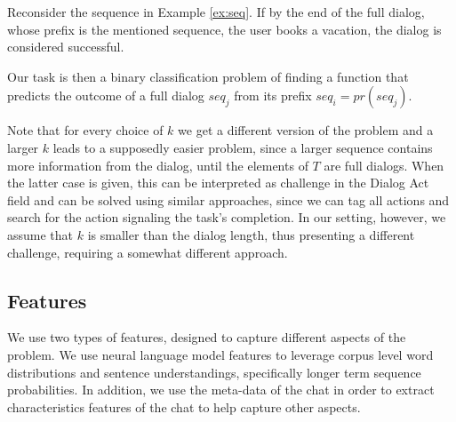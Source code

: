 \begin{example}
Reconsider the sequence in Example \ref{ex:seq}.  
If by the end of the full dialog, whose prefix is the mentioned sequence, 
the user books a vacation, the dialog is considered successful.
\end{example}


Our task is then a binary classification 
problem of finding a function that predicts the outcome 
of a full dialog $seq_j$ from its prefix $seq_i = pr(seq_j)$. 

Note that for every choice of $k$ we get a different 
version of the problem and a larger $k$ leads 
to a supposedly easier problem, since a larger sequence contains 
more information from the dialog, until the elements of $T$ 
are full dialogs. When the latter case is 
given, this can be interpreted as challenge in the Dialog Act field \cite{cs-CL-0006023,DBLP:conf/icassp/JiB05,DBLP:conf/coling/WermterL96} and can be solved using similar approaches, since we 
can tag all actions and search for the action signaling the task's completion. 
In our setting, however, we assume that $k$ is smaller than the dialog 
length, thus presenting a different challenge, requiring a somewhat different approach. 

\subsection{Features}
We use two types of features, designed to capture
different aspects of the problem. We use neural 
language model features to leverage corpus
level word distributions and sentence understandings, 
specifically longer term
sequence probabilities. In addition, we use the meta-data of the chat in order to extract characteristics features of the chat 
to help capture other aspects.

